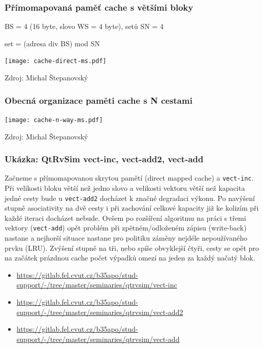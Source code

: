 \documentclass{beamer}
\begin{document}
\begin{frame}
\frametitle{Přímomapovaná paměť cache s většími bloky}

BS = 4 (16 byte, slovo WS = 4 byte), setů SN = 4

set = (adresa div BS) mod SN

{
\centering

\texttt{[image: cache-direct-ms.pdf]}

}

{\tiny Zdroj: Michal Štepanovský}
\end{frame}

\begin{frame}
\frametitle{Obecná organizace paměti cache s N cestami}

{
\centering

\texttt{[image: cache-n-way-ms.pdf]}

}

{\tiny Zdroj: Michal Štepanovský}

\end{frame}

\begin{frame}
\frametitle{Ukázka: QtRvSim vect-inc, vect-add2, vect-add}

Začneme s přímomapovanou skrytou pamětí (direct mapped cache) a \texttt{vect-inc}. Při velikosti bloku větší než jedno slovo a velikosti vektoru větší než kapacita jedné cesty bude u \texttt{vect-add2} docházet k značné degradaci výkonu. Po navýšení stupně asociativity na dvě cesty i při zachování celkové kapacity již ke kolizím při každé iteraci docházet nebude. Ovšem po rozšíření algoritmu na práci s třemi vektory (\texttt{vect-add}) opět problém při zpětném/odloženém zápisu (write-back) nastane a nejhorší situace nastane pro politiku záměny nejdéle nepoužívaného prvku (LRU). Zvýšení stupně na tři, nebo spíše obvyklejší čtyři, cesty se opět pro na začátek prázdnou cache počet výpadků omezí na jeden za každý načatý blok.

\begin{itemize}
\item \url{https://gitlab.fel.cvut.cz/b35apo/stud-support/-/tree/master/seminaries/qtrvsim/vect-inc}
\item \url{https://gitlab.fel.cvut.cz/b35apo/stud-support/-/tree/master/seminaries/qtrvsim/vect-add2}
\item \url{https://gitlab.fel.cvut.cz/b35apo/stud-support/-/tree/master/seminaries/qtrvsim/vect-add}
\end{itemize}

\end{frame}
\end{document}
